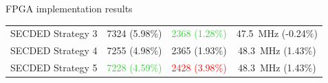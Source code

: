 \begin{frame}{FPGA implementation results}
\begin{table}[t]
\begin{tabular}{@{}rccc@{}}
            SECDED Strategy 3          & \num{7324} {\tiny (5.98\%)}                        & \textcolor{LimeGreen}{\num{2368} {\tiny (1.28\%)}} & \SI{47.5}{\mega\hertz} {\tiny (-0.24\%)} \\
            SECDED Strategy 4          & \num{7255} {\tiny (4.98\%)}                        & \num{2365} {\tiny (1.93\%)}                        & \SI{48.3}{\mega\hertz} {\tiny (1.43\%) } \\
            SECDED Strategy 5          & \textcolor{LimeGreen}{\num{7228} {\tiny (4.59\%)}} & \textcolor{red}{\num{2428} {\tiny (3.98\%)}}       & \SI{48.3}{\mega\hertz} {\tiny (1.43\%) } \\
            \bottomrule
        \end{tabular}
    \end{table}
    
\end{frame}
